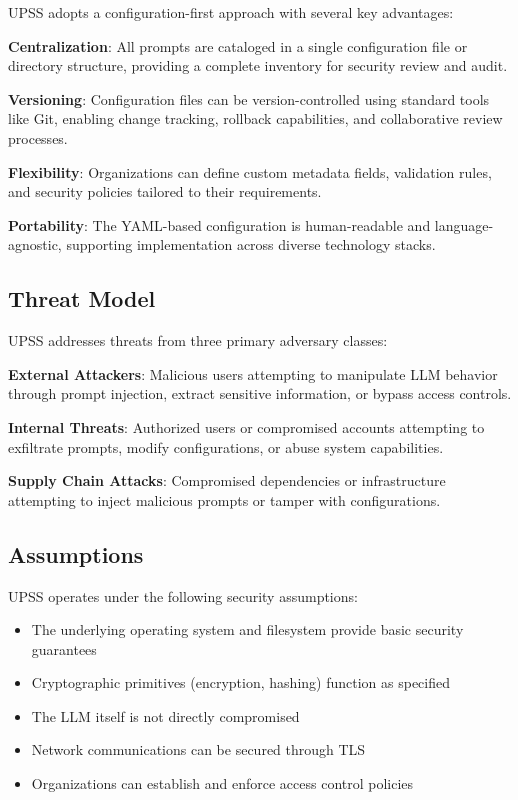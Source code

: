 UPSS adopts a configuration-first approach with several key advantages:

\textbf{Centralization}: All prompts are cataloged in a single configuration file or directory structure, providing a complete inventory for security review and audit.

\textbf{Versioning}: Configuration files can be version-controlled using standard tools like Git, enabling change tracking, rollback capabilities, and collaborative review processes.

\textbf{Flexibility}: Organizations can define custom metadata fields, validation rules, and security policies tailored to their requirements.

\textbf{Portability}: The YAML-based configuration is human-readable and language-agnostic, supporting implementation across diverse technology stacks.

\subsection{Threat Model}

UPSS addresses threats from three primary adversary classes:

\textbf{External Attackers}: Malicious users attempting to manipulate LLM behavior through prompt injection, extract sensitive information, or bypass access controls.

\textbf{Internal Threats}: Authorized users or compromised accounts attempting to exfiltrate prompts, modify configurations, or abuse system capabilities.

\textbf{Supply Chain Attacks}: Compromised dependencies or infrastructure attempting to inject malicious prompts or tamper with configurations.

\subsection{Assumptions}

UPSS operates under the following security assumptions:

\begin{itemize}
    \item The underlying operating system and filesystem provide basic security guarantees
    \item Cryptographic primitives (encryption, hashing) function as specified
    \item The LLM itself is not directly compromised
    \item Network communications can be secured through TLS
    \item Organizations can establish and enforce access control policies
\end{itemize}
